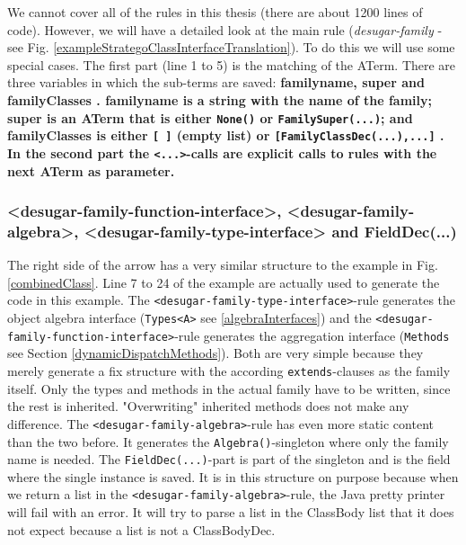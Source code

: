 \documentclass{report}
\begin{document}
\pagebreak
We cannot cover all of the rules in this thesis (there are about 1200 lines of code). However, we will have a detailed look at the main rule (\emph{desugar-family} - see Fig. \ref{exampleStrategoClassInterfaceTranslation}). To do this we will use some special cases. The first part (line 1 to 5) is the matching of the ATerm. There are three variables in which the sub-terms are saved: \bfseries familyname\mdseries, \bfseries super \mdseries and \bfseries familyClasses \mdseries. \bfseries familyname \mdseries is a string with the name of the family; \bfseries super \mdseries is an ATerm that is either \lstinline{None()} or \lstinline{FamilySuper(...)}; and \bfseries familyClasses \mdseries is either \lstinline{[ ]} (empty list) or \lstinline{[FamilyClassDec(...),...]} . In the second part the \lstinline{<...>}-calls are explicit calls to rules with the next ATerm as parameter.

\begin{flushleft}
\subsubsection{\textless desugar-family-function-interface\textgreater, \textless desugar-family-algebra\textgreater, \textless desugar-family-type-interface\textgreater{} and FieldDec(...)}
\end{flushleft}

The right side of the arrow has a very similar structure to the example in Fig. \ref{combinedClass}. Line 7 to 24 of the example are actually used to generate the code in this example. The \lstinline{<desugar-family-type-interface>}-rule generates the object algebra interface (\lstinline{Types<A>} see \ref{algebraInterfaces}) and the \lstinline{<desugar-family-function-interface>}-rule generates the aggregation interface (\lstinline{Methods} see Section \ref{dynamicDispatchMethods}). Both are very simple because they merely generate a fix structure with the according \lstinline{extends}-clauses as the family itself. Only the types and methods in the actual family have to be written, since the rest is inherited. "Overwriting" inherited methods does not make any difference. The \lstinline{<desugar-family-algebra>}-rule has even more static content than the two before. It generates the \lstinline{Algebra()}-singleton where only the family name is needed. The \lstinline{FieldDec(...)}-part is part of the singleton and is the field where the single instance is saved. It is in this structure on purpose because when we return a list in the \lstinline{<desugar-family-algebra>}-rule, the Java pretty printer will fail with an error. It will try to parse a list in the ClassBody list that it does not expect because a list is not a ClassBodyDec.
\end{document}
